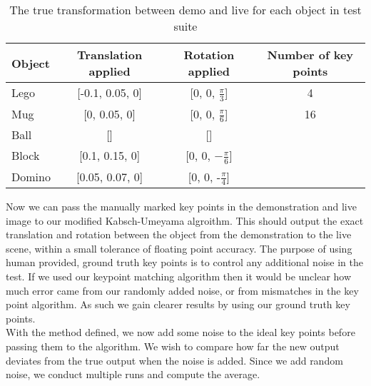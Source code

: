 \begin{table}[h!t]
    \begin{adjustbox}{center}
        \begin{tabular}{| V{5cm} || c | c | c |}
            \hline
            Object & Translation applied & Rotation applied & Number of key points \\
            \hline
            Lego & [-0.1, 0.05, 0] & [0, 0, $\frac{\pi}{3}$] & 4\\
            \hline
            Mug & [0, 0.05, 0] & [0, 0, $\frac{\pi}{6}$] & 16\\
            \hline
            Ball & [] & [] & \\
            \hline
            Block & [0.1, 0.15, 0] & [0, 0, $-\frac{\pi}{6}$] & \\
            \hline
            Domino & [0.05, 0.07, 0] & [0, 0, -$\frac{\pi}{4}$] & \\
            \hline
        \end{tabular}
    \end{adjustbox}
    \caption{The true transformation between demo and live for each object in test suite}
    \label{tab:test-suite}  
    \end{table}

Now we can pass the manually marked key points in the demonstration and live image to our modified Kabsch-Umeyama algroithm. This should output the exact translation and rotation between the object from the demonstration to the live scene, within a small tolerance of floating point accuracy. The purpose of using human provided, ground truth key points is to control any additional noise in the test. If we used our keypoint matching algorithm then it would be unclear how much error came from our randomly added noise, or from mismatches in the key point algorithm. As such we gain clearer results by using our ground truth key points.\\

With the method defined, we now add some noise to the ideal key points before passing them to the algorithm. We wish to compare how far the new output deviates from the true output when the noise is added. Since we add random noise, we conduct multiple runs and compute the average.\\


